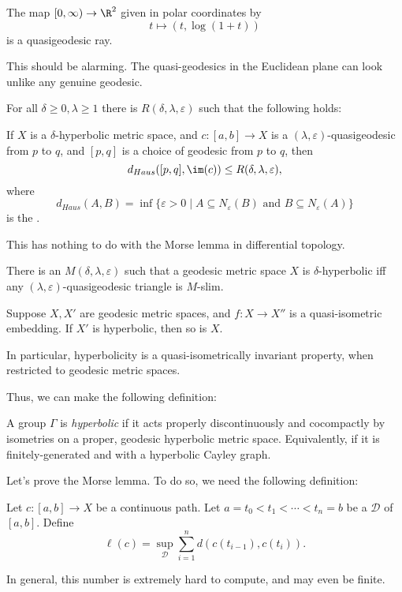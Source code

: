 \documentclass[a4paper]{article}
\begin{document}
\begin{eg}
  The map $[0, \infty) \to \R^2$ given in polar coordinates by
  \[
    t \mapsto (t, \log(1 + t))
  \]
  is a quasigeodesic ray.
\end{eg}
This should be alarming. The quasi-geodesics in the Euclidean plane can look unlike any genuine geodesic.

\begin{thm}
  For all $\delta \geq 0, \lambda \geq 1$ there is $R(\delta, \lambda, \varepsilon)$ such that the following holds:

  If $X$ is a $\delta$-hyperbolic metric space, and $c: [a, b] \to X$ is a $(\lambda, \varepsilon)$-quasigeodesic from $p$ to $q$, and $[p, q]$ is a choice of geodesic from $p$ to $q$, then
  \[
    d_{Haus}([p, q], \im(c)) \leq R(\delta, \lambda, \varepsilon),
  \]
  where
  \[
    d_{Haus}(A, B) = \inf\{\varepsilon > 0 \mid A \subseteq N_\varepsilon(B) \text{ and }B \subseteq N_\varepsilon(A)\}
  \]
  is the .
\end{thm}
This has nothing to do with the Morse lemma in differential topology.

\begin{cor}
  There is an $M(\delta, \lambda, \varepsilon)$ such that a geodesic metric space $X$ is $\delta$-hyperbolic iff any $(\lambda, \varepsilon)$-quasigeodesic triangle is $M$-slim.
\end{cor}

\begin{cor}
  Suppose $X, X'$ are geodesic metric spaces, and $f: X \to X''$ is a quasi-isometric embedding. If $X'$ is hyperbolic, then so is $X$.

  In particular, hyperbolicity is a quasi-isometrically invariant property, when restricted to geodesic metric spaces.
\end{cor}

Thus, we can make the following definition:
\begin{defi}
  A group $\Gamma$ is \emph{hyperbolic} if it acts properly discontinuously and cocompactly by isometries on a proper, geodesic hyperbolic metric space. Equivalently, if it is finitely-generated and with a hyperbolic Cayley graph.
\end{defi}

Let's prove the Morse lemma. To do so, we need the following definition:
\begin{defi}
  Let $c: [a, b] \to X$ be a continuous path. Let $a = t_0 < t_1 < \cdots < t_n = b$ be a  $\mathcal{D}$ of $[a, b]$. Define
  \[
    \ell (c) = \sup_{\mathcal{D}} \sum_{i = 1}^n d(c(t_{i - 1}), c(t_i)).
  \]
\end{defi}
In general, this number is extremely hard to compute, and may even be finite.
\end{document}
